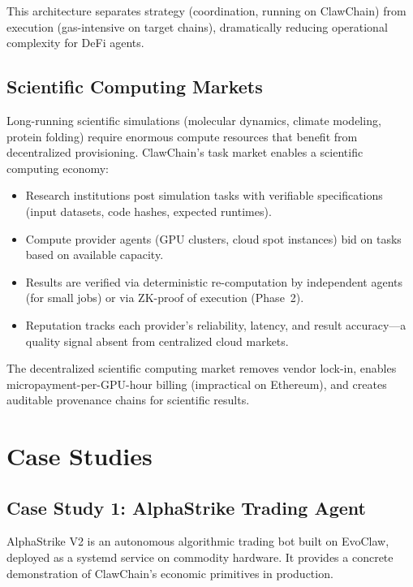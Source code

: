 \documentclass[conference]{IEEEtran}
\begin{document}
This architecture separates strategy (coordination, running on ClawChain) from execution (gas-intensive on target chains), dramatically reducing operational complexity for DeFi agents.

\subsection{Scientific Computing Markets}

Long-running scientific simulations (molecular dynamics, climate modeling, protein folding) require enormous compute resources that benefit from decentralized provisioning. ClawChain's task market enables a scientific computing economy:

\begin{itemize}
    \item Research institutions post simulation tasks with verifiable specifications (input datasets, code hashes, expected runtimes).
    \item Compute provider agents (GPU clusters, cloud spot instances) bid on tasks based on available capacity.
    \item Results are verified via deterministic re-computation by independent agents (for small jobs) or via ZK-proof of execution (Phase~2).
    \item Reputation tracks each provider's reliability, latency, and result accuracy---a quality signal absent from centralized cloud markets.
\end{itemize}

The decentralized scientific computing market removes vendor lock-in, enables micropayment-per-GPU-hour billing (impractical on Ethereum), and creates auditable provenance chains for scientific results.



\section{Case Studies}\label{sec:casestudies}

\subsection{Case Study 1: AlphaStrike Trading Agent}

AlphaStrike V2 is an autonomous algorithmic trading bot built on EvoClaw, deployed as a systemd service on commodity hardware. It provides a concrete demonstration of ClawChain's economic primitives in production.
\end{document}
